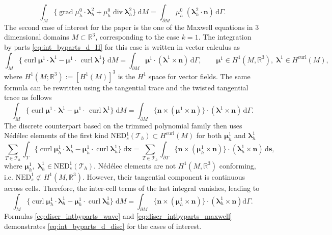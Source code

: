 \documentclass{elsarticle}
\renewcommand\d{\ensuremath{\mathrm{d}}}
\newcommand{\bbR}{\mathbb{R}}
\DeclareMathOperator*{\grad}{grad}
\renewcommand{\div}{\operatorname{div}}
\DeclareMathOperator*{\curl}{curl}
\begin{document}
{\begin{equation}\label{eq:discr_intbyparts_wave}
    \int_M\{\grad \mu^0_h \cdot \bm{\lambda}^2_h + \mu^0_h \div \bm{\lambda}^2_h\} \;  \d{M} =\int_{\partial M} \mu^0_h \; (\bm{\lambda}^2_h \cdot \bm{n})\, \d\Gamma.
\end{equation}
The second case of interest for the paper is the one of the Maxwell equations in 3 dimensional domains $M \subset \bbR^3$, corresponding to the case $k=1$. The integration by parts \eqref{eq:int_byparts_d_H} for this case is written in vector calculus as
\begin{equation*}
    \int_M \{  \curl\bm{\mu}^1 \cdot \bm{\lambda}^1 - \bm{\mu}^1 \cdot\, \curl \bm{\lambda}^1 \} \; \d{M} = \int_{\partial M} \bm{\mu}^1 \cdot (\bm{\lambda}^1 \times \bm{n}) \, \d\Gamma, \qquad \bm{\mu}^1 \in H^1(M, \bbR^3), \; \bm{\lambda}^1 \in H^{\curl}(M),
\end{equation*}
where $H^1(M; \bbR^3) := [H^1(M)]^3$ is the $H^1$ space for vector fields. The same formula  can be rewritten using the tangential trace and the twisted tangential trace as follows \cite[Eq. 27]{buffa2002} 
\begin{equation*}
\int_M \{  \curl \bm{\mu}^1 \cdot \, \bm{\lambda}^1 - \bm{\mu}^1 \cdot \, \curl \bm{\lambda}^1 \} \; \d M = \int_{\partial M}  \{\bm{n} \times (\bm{\mu}^1 \times \bm{n})\} \cdot (\bm{\lambda}^1 \times \bm{n}) \, \d\Gamma.
\end{equation*}
The discrete counterpart based on the trimmed polynomial family then uses Nédélec elements of the first kind NED$_s^1(\mathcal{T}_h) \subset H^{\curl}(M)$ for both $\bm{\mu}^1_h$ and $\bm{\lambda}^1_h$
\begin{equation*}
\sum_{T \in \mathcal{T}_h} \int_T \{  \curl \bm{\mu}^1_h \cdot \bm{\lambda}^1_h - \bm{\mu}^1_h \cdot \curl \bm{\lambda}^1_h \} \; \d\bm{x} = \sum_{T \in \mathcal{T}_h} \int_{\partial T}  \{\bm{n} \times (\bm{\mu}^1_h \times \bm{n})\} \cdot (\bm{\lambda}_h^1 \times \bm{n})\, \d\bm{s},
\end{equation*}
where $\bm{\mu}^1_h, \; \bm{\lambda}^1_h \in \mathrm{NED}_s^1(\mathcal{T}_h)$. Nédélec elements are not $H^1(M,\bbR^3)$ conforming, i.e. $\mathrm{NED}_s^1\not\subset H^1(M, \bbR^3)$. However, their tangential component is continuous across cells. Therefore, the inter-cell terms of the last integral vanishes, leading to
\begin{equation}\label{eq:discr_intbyparts_maxwell}
\int_M \{  \curl \bm{\mu}^1_h \cdot \bm{\lambda}^1_h - \bm{\mu}^1_h \cdot \curl \bm{\lambda}^1_h \} \; \d M = \int_{\partial M}  \{\bm{n} \times (\bm{\mu}^1_h \times \bm{n})\} \cdot (\bm{\lambda}_h^1 \times \bm{n}) \d\Gamma.
\end{equation}
Formulas \eqref{eq:discr_intbyparts_wave} and \eqref{eq:discr_intbyparts_maxwell} demonstrates \eqref{eq:int_byparts_d_disc} for the cases of interest. 


}
\end{document}
